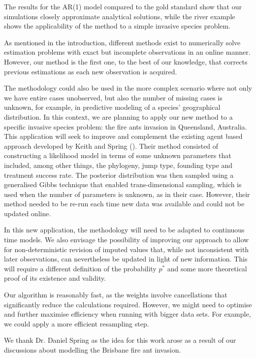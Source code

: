The results for the AR(1) model compared to the gold standard show that our simulations closely approximate analytical solutions, while the river example shows the applicability of the method to a simple invasive species problem.

As mentioned in the introduction, different methods exist to numerically solve estimation problems with exact but incomplete observations in an online manner. However, our method is the first one, to the best of our knowledge, that corrects previous estimations as each new observation is acquired.

The methodology could also be used in the more complex scenario where not only we have entire cases unobserved, but also the number of missing cases is unknown, for example, in predictive modeling of a species' geographical distribution. In this context, we are planning to apply our new method to a specific invasive species problem: the fire ants invasion in Queensland, Australia. This application will seek to improve and complement the existing agent based approach developed by Keith and Spring (\cite{Keith}). Their method consisted of constructing a likelihood model in terms of some unknown parameters that included, among other things, the phylogeny, jump type, founding type and treatment success rate. The posterior distribution was then sampled using a generalised Gibbs technique that enabled trans-dimensional sampling, which is used when the number of parameters is unknown, as in their case. However, their method needed to be re-run each time new data was available and could not be updated online.

In this new application, the methodology will need to be adapted to continuous time models. We also envisage the possibility of improving our approach to allow for non-deterministic revision of imputed values that, while not inconsistent with later observations, can nevertheless be updated in light of new information. This will require a different definition of the probability $p^*$ and some more theoretical proof of its existence and validity. 

Our algorithm is reasonably fast, as the weights involve cancellations that significantly reduce the calculations required. However, we might need to optimise and further maximise efficiency when running with bigger data sets. For example, we could apply a more efficient resampling step.



\begin{acknowledgements}
We thank Dr. Daniel Spring as the idea for this work arose as a result of our discussions about modelling the Brisbane fire ant invasion.
\end{acknowledgements}

